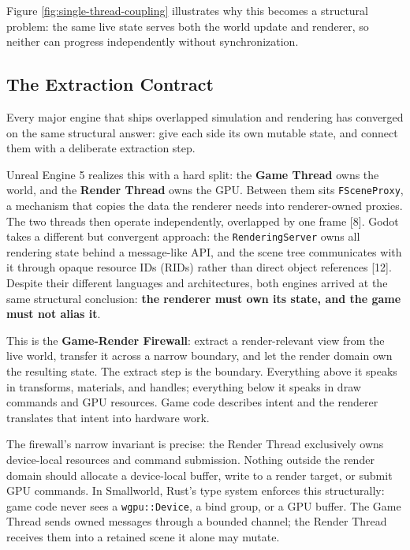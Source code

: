 \documentclass[
  11pt,
  letterpaper,
  DIV=11,
  numbers=noendperiod,
  twoside,
  open=right]{scrreprt}
\begin{document}
Figure \ref{fig:single-thread-coupling} illustrates why this becomes a
structural problem: the same live state serves both the world update and
renderer, so neither can progress independently without synchronization.



\subsection{The Extraction Contract}\label{the-extraction-contract}

Every major engine that ships overlapped simulation and rendering has
converged on the same structural answer: give each side its own mutable
state, and connect them with a deliberate extraction step.

Unreal Engine 5 realizes this with a hard split: the \textbf{Game
Thread} owns the world, and the \textbf{Render Thread} owns the GPU.
Between them sits \texttt{FSceneProxy}, a mechanism that copies the data
the renderer needs into renderer-owned proxies. The two threads then
operate independently, overlapped by one frame {[}8{]}. Godot takes a
different but convergent approach: the \texttt{RenderingServer} owns all
rendering state behind a message-like API, and the scene tree
communicates with it through opaque resource IDs (RIDs) rather than
direct object references {[}12{]}. Despite their different languages and
architectures, both engines arrived at the same structural conclusion:
\textbf{the renderer must own its state, and the game must not alias
it}.

This is the \textbf{Game-Render Firewall}: extract a render-relevant
view from the live world, transfer it across a narrow boundary, and let
the render domain own the resulting state. The extract step is the
boundary. Everything above it speaks in transforms, materials, and
handles; everything below it speaks in draw commands and GPU resources.
Game code describes intent and the renderer translates that intent into
hardware work.

The firewall's narrow invariant is precise: the Render Thread
exclusively owns device-local resources and command submission. Nothing
outside the render domain should allocate a device-local buffer, write
to a render target, or submit GPU commands. In Smallworld, Rust's type
system enforces this structurally: game code never sees a
\texttt{wgpu::Device}, a bind group, or a GPU buffer. The Game Thread
sends owned messages through a bounded channel; the Render Thread
receives them into a retained scene it alone may mutate.
\end{document}
